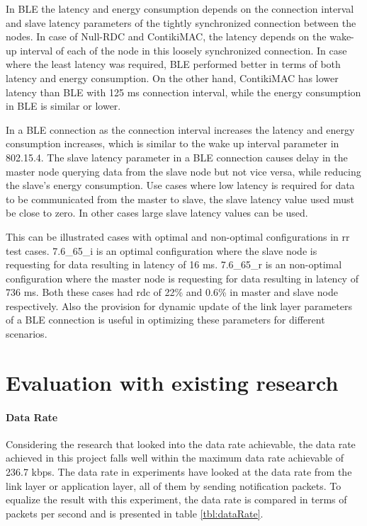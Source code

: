 In BLE the latency and energy consumption depends on the connection interval and slave latency parameters of the tightly synchronized connection between the nodes. In case of Null-RDC and ContikiMAC, the latency depends on the wake-up interval of each of the node in this loosely synchronized connection. In case where the least latency was required, BLE performed better in terms of both latency and energy consumption. On the other hand, ContikiMAC has lower latency than BLE with 125 ms connection interval, while the energy consumption in BLE is similar or lower.

In a BLE connection as the connection interval increases the latency and energy consumption increases, which is similar to the wake up interval parameter in 802.15.4. The slave latency parameter in a BLE connection causes delay in the master node querying data from the slave node but not vice versa, while reducing the slave's energy consumption. Use cases where low latency is required for data to be communicated from the master to slave, the slave latency value used must be close to zero. In other cases large slave latency values can be used. 

This can be illustrated cases with optimal and non-optimal configurations in \gls{rr} test cases. 7.6\_65\_i is an optimal configuration where the slave node is requesting for data resulting in latency of 16 ms. 7.6\_65\_r is an non-optimal configuration where the master node is requesting for data resulting in latency of 736 ms. Both these cases had \gls{rdc} of 22\% and 0.6\% in master and slave node respectively. Also the provision for dynamic update of the link layer parameters of a BLE connection is useful in optimizing these parameters for different scenarios.

\section{Evaluation with existing research} \label{7Eval}
\paragraph{Data Rate}
Considering the research that looked into the data rate achievable, the data rate achieved in this project falls well within the maximum data rate achievable\cite{Gomez2011} of 236.7 kbps. The data rate in experiments have looked at the data rate from the link layer\cite{Mikhaylov2013} or application layer\cite{Gomez2012}\cite{Mackensen2012}\cite{Kindt2014}, all of them by sending notification packets. To equalize the result with this experiment, the data rate is compared in terms of packets per second and is presented in table \ref{tbl:dataRate}.

